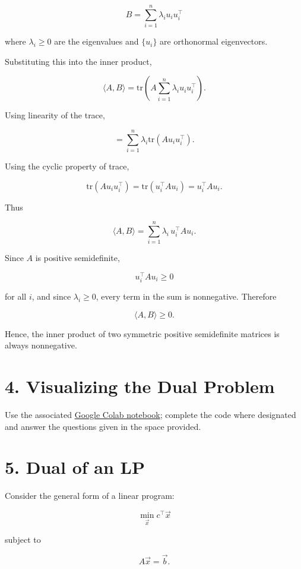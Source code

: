 \documentclass[
  12pt,
]{fphw}
\begin{document}
\[
B = \sum_{i=1}^{n} \lambda_i u_i u_i^\top
\]

where $\lambda_i \ge 0$ are the eigenvalues and $\{u_i\}$ are orthonormal eigenvectors.

Substituting this into the inner product,

\[
\langle A,B\rangle
=
\mathrm{tr}\left(A \sum_{i=1}^{n} \lambda_i u_i u_i^\top\right).
\]

Using linearity of the trace,

\[
=
\sum_{i=1}^{n} \lambda_i \mathrm{tr}(A u_i u_i^\top).
\]

Using the cyclic property of trace,

\[
\mathrm{tr}(A u_i u_i^\top) = \mathrm{tr}(u_i^\top A u_i) = u_i^\top A u_i.
\]

Thus

\[
\langle A,B\rangle
=
\sum_{i=1}^{n} \lambda_i \, u_i^\top A u_i.
\]

Since $A$ is positive semidefinite,

\[
u_i^\top A u_i \ge 0
\]

for all $i$, and since $\lambda_i \ge 0$, every term in the sum is nonnegative. Therefore

\[
\langle A,B\rangle \ge 0.
\]

Hence, the inner product of two symmetric positive semidefinite matrices is always nonnegative.

\newpage
\section*{4. Visualizing the Dual Problem}

Use the associated \href{https://colab.research.google.com/drive/1UxmJhZRjMUeEN7XkzIh8jdUES8iBQxBP?usp=sharing}{Google Colab notebook}; complete the code where designated and answer the questions given in the space provided.


\newpage
\section*{5. Dual of an LP}

Consider the general form of a linear program:

\[
\min_{\vec{x}} c^\top \vec{x}
\tag{16}
\]

subject to

\[
A\vec{x}= \vec{b}.
\tag{17}
\]
\end{document}
